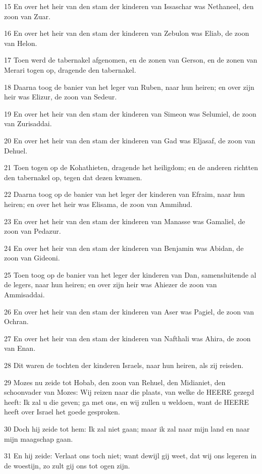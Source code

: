 \par 15 En over het heir van den stam der kinderen van Issaschar was Nethaneel, den zoon van Zuar.
\par 16 En over het heir van den stam der kinderen van Zebulon was Eliab, de zoon van Helon.
\par 17 Toen werd de tabernakel afgenomen, en de zonen van Gerson, en de zonen van Merari togen op, dragende den tabernakel.
\par 18 Daarna toog de banier van het leger van Ruben, naar hun heiren; en over zijn heir was Elizur, de zoon van Sedeur.
\par 19 En over het heir van den stam der kinderen van Simeon was Selumiel, de zoon van Zurisaddai.
\par 20 En over het heir van den stam der kinderen van Gad was Eljasaf, de zoon van Dehuel.
\par 21 Toen togen op de Kohathieten, dragende het heiligdom; en de anderen richtten den tabernakel op, tegen dat dezen kwamen.
\par 22 Daarna toog op de banier van het leger der kinderen van Efraim, naar hun heiren; en over het heir was Elisama, de zoon van Ammihud.
\par 23 En over het heir van den stam der kinderen van Manasse was Gamaliel, de zoon van Pedazur.
\par 24 En over het heir van den stam der kinderen van Benjamin was Abidan, de zoon van Gideoni.
\par 25 Toen toog op de banier van het leger der kinderen van Dan, samensluitende al de legers, naar hun heiren; en over zijn heir was Ahiezer de zoon van Ammisaddai.
\par 26 En over het heir van den stam der kinderen van Aser was Pagiel, de zoon van Ochran.
\par 27 En over het heir van den stam der kinderen van Nafthali was Ahira, de zoon van Enan.
\par 28 Dit waren de tochten der kinderen Israels, naar hun heiren, als zij reisden.
\par 29 Mozes nu zeide tot Hobab, den zoon van Rehuel, den Midianiet, den schoonvader van Mozes: Wij reizen naar die plaats, van welke de HEERE gezegd heeft: Ik zal u die geven; ga met ons, en wij zullen u weldoen, want de HEERE heeft over Israel het goede gesproken.
\par 30 Doch hij zeide tot hem: Ik zal niet gaan; maar ik zal naar mijn land en naar mijn maagschap gaan.
\par 31 En hij zeide: Verlaat ons toch niet; want dewijl gij weet, dat wij ons legeren in de woestijn, zo zult gij ons tot ogen zijn.
